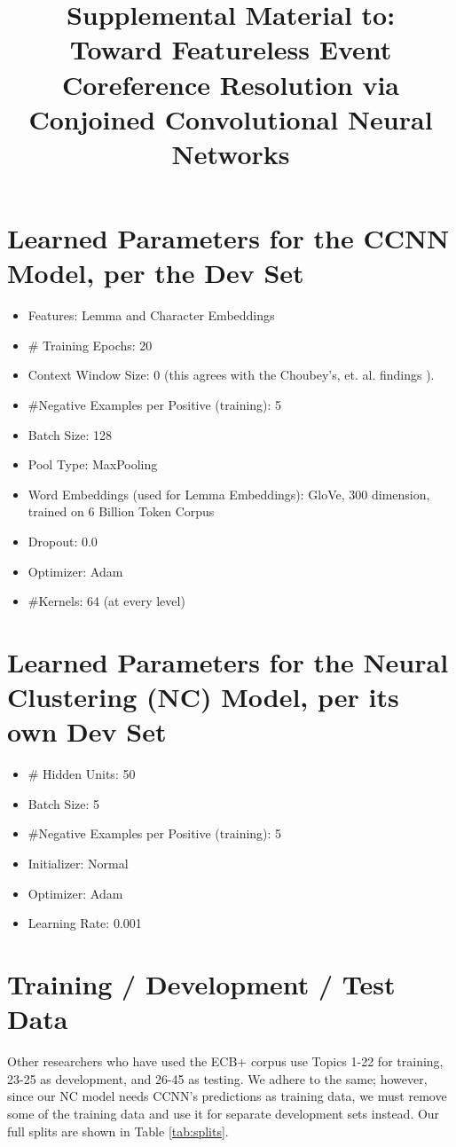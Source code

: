 \documentclass[11pt,a4paper]{article}
\title{Supplemental Material to: \\
Toward Featureless Event Coreference Resolution via Conjoined Convolutional Neural Networks}
\begin{document}
\maketitle

\section{Learned Parameters for the CCNN Model, per the Dev Set}
\begin{itemize}
\item Features: Lemma and Character Embeddings
\item \# Training Epochs: 20
\item Context Window Size: 0 (this agrees with the Choubey's, et. al. findings ).
\item \#Negative Examples per Positive (training): 5
\item Batch Size: 128
\item Pool Type: MaxPooling
\item Word Embeddings (used for Lemma Embeddings): GloVe, 300 dimension, trained on 6 Billion Token Corpus
\item Dropout: 0.0
\item Optimizer: Adam
\item \#Kernels: 64 (at every level)
\end{itemize}

\section{Learned Parameters for the Neural Clustering (NC) Model, per its own Dev Set}
\begin{itemize}
\item \# Hidden Units: 50
\item Batch Size: 5
\item \#Negative Examples per Positive (training): 5
\item Initializer: Normal
\item Optimizer: Adam
\item Learning Rate: 0.001
\end{itemize}

\section{Training / Development / Test Data}
Other researchers who have used the ECB+ corpus use Topics 1-22 for training, 23-25 as development, and 26-45 as testing.  We adhere to the same; however, since our NC model needs CCNN's predictions as training data, we must remove some of the training data and use it for separate development sets instead.  Our full splits are shown in Table \ref{tab:splits}.
\end{document}
